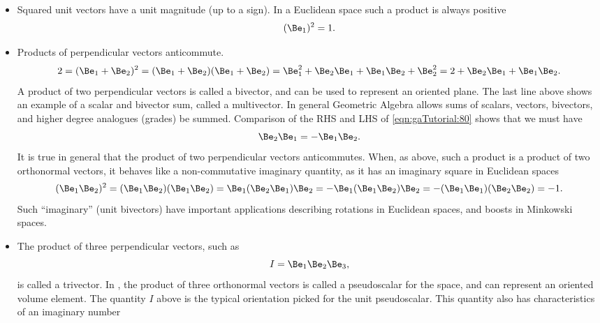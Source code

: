 \begin{itemize}
\item Squared unit vectors have a unit magnitude (up to a sign).  In a Euclidean space such a product is always positive
%
\begin{equation}\label{eqn:gaTutorial:60}
(\Be_1)^2 = 1.
\end{equation}
%
\item Products of perpendicular vectors anticommute.
%
\begin{dmath}\label{eqn:gaTutorial:80}
2
=
(\Be_1 + \Be_2)^2
= (\Be_1 + \Be_2)(\Be_1 + \Be_2)
= \Be_1^2 + \Be_2 \Be_1 + \Be_1 \Be_2 + \Be_2^2
= 2 + \Be_2 \Be_1 + \Be_1 \Be_2.
\end{dmath}
%
A product of two perpendicular vectors is called a bivector, and can be used to represent an oriented plane.  The last line above shows an example of a scalar and bivector sum, called a multivector.  In general Geometric Algebra allows sums of scalars, vectors, bivectors, and higher degree analogues (grades) be summed.
%
Comparison of the RHS and LHS of \cref{eqn:gaTutorial:80} shows that we must have
%
\begin{equation}\label{eqn:gaTutorial:100}
\Be_2 \Be_1 = -\Be_1 \Be_2.
\end{equation}
%
It is true in general that the product of two perpendicular vectors anticommutes.  When, as above, such a product is a product of
two orthonormal vectors, it behaves like a non-commutative imaginary quantity, as it has an imaginary square in Euclidean spaces
%
\begin{dmath}\label{eqn:gaTutorial:120}
(\Be_1 \Be_2)^2
=
(\Be_1 \Be_2)
(\Be_1 \Be_2)
=
\Be_1 (\Be_2
\Be_1) \Be_2
=
-\Be_1 (\Be_1
\Be_2) \Be_2
=
-(\Be_1 \Be_1)
(\Be_2 \Be_2)
=-1.
\end{dmath}
%
Such ``imaginary'' (unit bivectors) have important applications describing rotations in Euclidean spaces, and boosts in Minkowski spaces.
%
\item
The product of three perpendicular vectors, such as
%
\begin{equation}\label{eqn:gaTutorial:140}
I = \Be_1 \Be_2 \Be_3,
\end{equation}
%
is called a trivector.  In , the product of three orthonormal vectors is called a pseudoscalar for the space, and can represent an oriented volume element.  The quantity \( I \) above is the typical orientation picked for the  unit pseudoscalar.  This quantity also has characteristics of an imaginary number
%
\begin{dmath}\label{eqn:gaTutorial:160}

\end{dmath}
\end{itemize}
